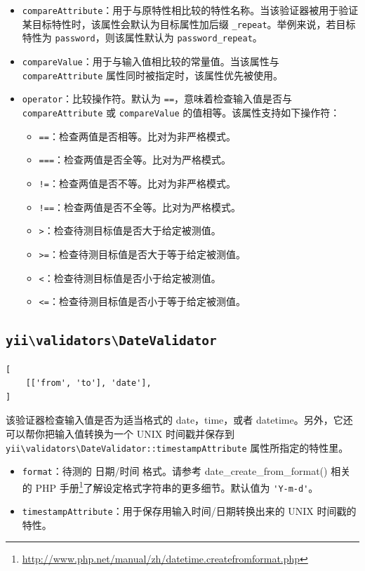 \begin{itemize}
\item \lstinline|compareAttribute|：用于与原特性相比较的特性名称。当该验证器被用于验证某目标特性时，该属性会默认为目标属性加后缀 \lstinline|_repeat|。举例来说，若目标特性为 \lstinline|password|，则该属性默认为 \lstinline|password_repeat|。
\item \lstinline|compareValue|：用于与输入值相比较的常量值。当该属性与 \lstinline|compareAttribute| 属性同时被指定时，该属性优先被使用。
\item \lstinline|operator|：比较操作符。默认为 \lstinline|==|，意味着检查输入值是否与 \lstinline|compareAttribute| 或 \lstinline|compareValue| 的值相等。该属性支持如下操作符：\begin{itemize}
\item \lstinline|==|：检查两值是否相等。比对为非严格模式。
\item \lstinline|===|：检查两值是否全等。比对为严格模式。
\item \lstinline|!=|：检查两值是否不等。比对为非严格模式。
\item \lstinline|!==|：检查两值是否不全等。比对为严格模式。
\item \lstinline|>|：检查待测目标值是否大于给定被测值。
\item \lstinline|>=|：检查待测目标值是否大于等于给定被测值。
\item \lstinline|<|：检查待测目标值是否小于给定被测值。
\item \lstinline|<=|：检查待测目标值是否小于等于给定被测值。
\end{itemize}

\end{itemize}
\subsection{\texttt{yii{\allowbreak{}\textbackslash}validators{\allowbreak{}\textbackslash}DateValidator} \label{tutorial-core-validators.md::date}}
\lstset{language=php}\begin{lstlisting}
[
    [['from', 'to'], 'date'],
]
\end{lstlisting}
该验证器检查输入值是否为适当格式的 date，time，或者 datetime。另外，它还可以帮你把输入值转换为一个 UNIX 时间戳并保存到 \texttt{yii{\allowbreak{}\textbackslash}validators{\allowbreak{}\textbackslash}DateValidator\allowbreak{}::\allowbreak{}timestampAttribute} 属性所指定的特性里。

\begin{itemize}
\item \lstinline|format|：待测的 日期/时间 格式。请参考
date\_create\_from\_format() 相关的 PHP 手册\footnote{\url{http://www.php.net/manual/zh/datetime.createfromformat.php}}了解设定格式字符串的更多细节。默认值为 \lstinline|'Y-m-d'|。
\item \lstinline|timestampAttribute|：用于保存用输入时间/日期转换出来的 UNIX 时间戳的特性。
\end{itemize}
